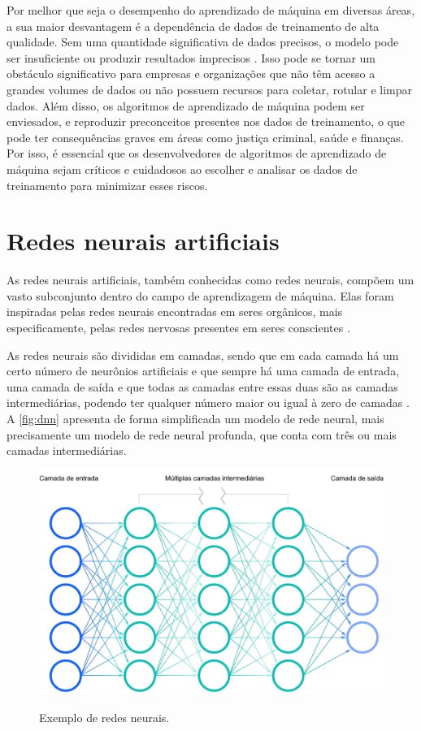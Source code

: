 Por melhor que seja o desempenho do aprendizado de máquina em diversas áreas, a sua maior desvantagem é a dependência de dados de treinamento de alta qualidade. 
Sem uma quantidade significativa de dados precisos, o modelo pode ser insuficiente ou produzir resultados imprecisos \cite{geeron2017handson}. 
Isso pode se tornar um obstáculo significativo para empresas e organizações que não têm acesso a grandes volumes de dados ou não possuem recursos para coletar, rotular e limpar dados. 
Além disso, os algoritmos de aprendizado de máquina podem ser enviesados, e reproduzir preconceitos presentes nos dados de treinamento, o que pode ter consequências graves em áreas como justiça criminal, saúde e finanças. 
Por isso, é essencial que os desenvolvedores de algoritmos de aprendizado de máquina sejam críticos e cuidadosos ao escolher e analisar os dados de treinamento para minimizar esses riscos.


\section{Redes neurais artificiais}

As redes neurais artificiais, também conhecidas como redes neurais, compõem um vasto subconjunto dentro do campo de aprendizagem de máquina. Elas foram inspiradas pelas redes neurais encontradas em seres orgânicos, mais especificamente, pelas redes nervosas presentes em seres conscientes \cite{ibm2020NN}.

As redes neurais são divididas  em camadas, sendo que em cada camada há um certo número de neurônios artificiais e que sempre há uma camada de entrada, uma camada de saída e que todas as camadas entre essas duas são as camadas intermediárias, podendo ter qualquer número maior ou igual à zero de camadas \cite{ibm2020NN}.
A \autoref{fig:dnn} apresenta de forma simplificada um modelo de rede neural, mais precisamente um modelo de rede neural profunda, que conta com três ou mais camadas intermediárias.

\begin{figure}[htb]
    \centering
    \caption{Exemplo de redes neurais.}
    \includegraphics[width=1.0\linewidth]{images/dnn.jpg}
    \label{fig:dnn}
\end{figure}

